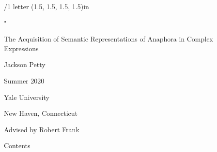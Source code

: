 % 




\margins/1 letter (1.5, 1.5, 1.5, 1.5)in %


\def\Auburn{}
\hyperlinks \Auburn \Blue

\let\title\tit
\let\capter\chap
\let\ssec\secc


\activettchar"

\def\tocline#1#2#3#4#5{{\leftskip=#1\iindent \rightskip=2\iindent
	\ifischap\advance\leftskip by\iindent\fi
	\ifnum#1>1 \advance\leftskip by 0.2\iindent\fi
	\toclinehook \noindent\llap{#2\toclink{#3}\enspace}%
		{#2#4}\nobreak\tocdotfill\pglink{#5}\nobreak\hskip-2\iindent\null\par}}

\def\titfont{\typobase\typoscale[\magstep2/\magstep2]\bcaps\bf}

\def\folio{\ifnum\pageno<2 \else\number\pageno \fi}

\overfullrule=0pt

\title The Acquisition of Semantic Representations of Anaphora in Complex Expressions

\bigskip
\bigskip
\par\centerline{Jackson Petty}
\bigskip
\bigskip
\par\centerline{Summer 2020}
\centerline{Yale University}
\centerline{New Haven, Connecticut}
\bigskip
\bigskip
\par\centerline{Advised by Robert Frank}

\vfill


\vfil\eject

\nonum\notoc\sec Contents

\maketoc

